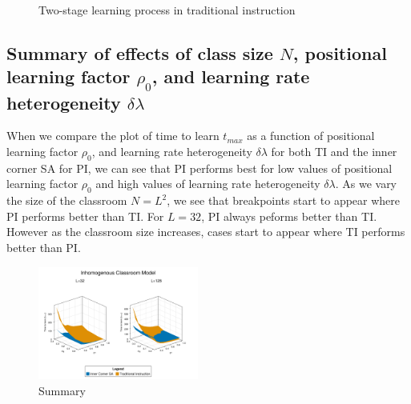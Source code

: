 \documentclass[twocolumn,secnumarabic,amssymb, nobibnotes, aps, prd]{revtex4-2}
\begin{document}
    \begin{figure}[htbp!]
        \centering
        \caption{Two-stage learning process in traditional instruction}
        \label{fig:two stage learning}
    \end{figure}


    \subsection{Summary of effects of class size $N$, positional learning factor $\rho_0$, and learning rate heterogeneity $\delta\lambda$}

    When we compare the plot of time to learn $t_{max}$ as a function of positional learning factor $\rho_0$, and learning rate heterogeneity $\delta\lambda$ for both TI and the inner corner SA for PI, we can see that PI performs best for low values of positional learning factor $\rho_0$ and high values of learning rate heterogeneity $\delta\lambda$.
    As we vary the size of the classroom $N=L^2$, we see that breakpoints start to appear where PI performs better than TI.
    For $L=32$, PI always peforms better than TI.
    However as the classroom size increases, cases start to appear where TI performs better than PI.

    \begin{figure}[htbp!]
        \centering
        \includegraphics[width=0.47\textwidth]{figures/2D-BPCAIH-analysis/rho-dl-t plots/32-128 comparison.png}
        \caption{Summary}
        \label{fig:Params effect summary}
    \end{figure}
\end{document}
